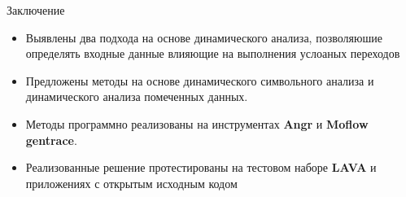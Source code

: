 \documentclass[10pt]{beamer}
\begin{document}
\begin{frame}{Заключение}

\begin{itemize}
\item Выявлены два подхода на основе динамического анализа, позволяюшие определять входные данные влияющие на выполнения услоаных переходов
\item Предложены методы на основе динамического символьного анализа и динамического анализа помеченных данных.
\item Методы программно реализованы на инструментах \textbf{Angr} и \textbf{Moflow gentrace}.
\item Реализованные решение протестированы на тестовом наборе \textbf{LAVA} и приложениях с открытым исходным кодом
\end{itemize}


\end{frame}

\end{document}
